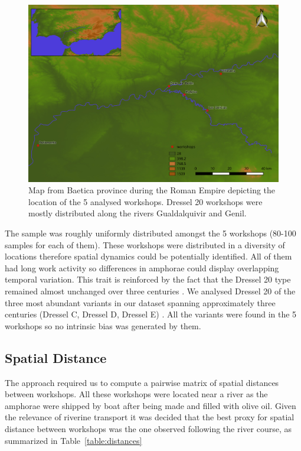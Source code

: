 \documentclass[review]{elsarticle}
\begin{document}
\begin{figure}[htp]
	\centering
\includegraphics[width=\linewidth]{figs/romanworkshop}
\caption{Map from Baetica province during the Roman Empire depicting the location of the 5 analysed workshops. Dressel 20 workshops were mostly distributed along the rivers Gualdalquivir and Genil.}
\label{romanworkshop}
\end{figure} 

The sample was roughly uniformly distributed amongst the 5 workshops (80-100 samples for each of them). These workshops were distributed in a diversity of locations therefore spatial dynamics could be potentially identified. All of them had long work activity so differences in amphorae could display overlapping temporal variation. 
This trait is reinforced by the fact that the Dressel 20 type remained almost unchanged over three centuries \citep{berni_dressel_2016}. We analysed Dressel 20 of the three most abundant variants in our dataset spanning approximately three centuries (Dressel C, Dressel D, Dressel E) \citep{martin-kilcher_romischen_1994,berni_millet_epigrafianforica_2008}. All the variants were found in the 5 workshops so no intrinsic bias was generated by them. 

\subsection{Spatial Distance}

The approach required us to compute a pairwise matrix of spatial distances between workshops. All these workshops were located near a river as the amphorae were shipped by boat after being made and filled with olive oil. Given the relevance of riverine transport it was decided that the best proxy for spatial distance between workshops was the one observed following the river course, as summarized in Table~\ref{table:distances}
\end{document}
